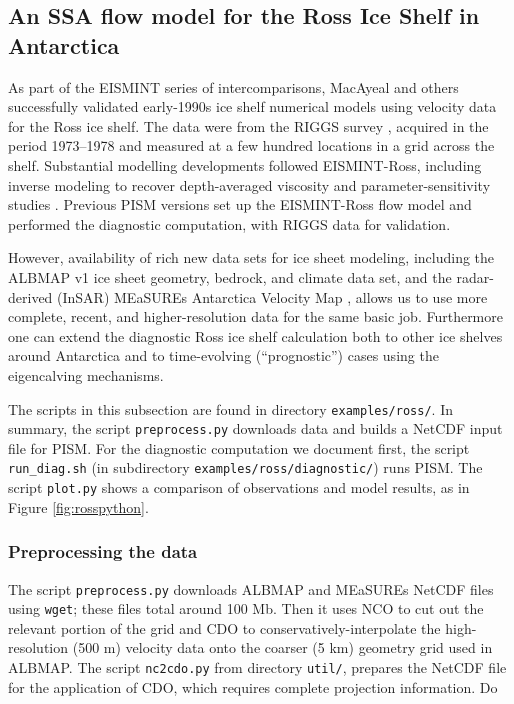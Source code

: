 \subsection{An SSA flow model for the Ross Ice Shelf in Antarctica}\label{sec:ross}   

As part of the EISMINT series of intercomparisons, MacAyeal and others \cite{MacAyealetal} successfully validated early-1990s ice shelf numerical models using velocity data for the Ross ice shelf.  The data were from the RIGGS survey \cite{RIGGS2}, acquired in the period 1973--1978 and measured at a few hundred locations in a grid across the shelf.  Substantial modelling developments followed EISMINT-Ross, including inverse modeling to recover depth-averaged viscosity \cite{RommelaereMacAyeal} and parameter-sensitivity studies \cite{HumbertGreveHutter}.  Previous PISM versions set up the EISMINT-Ross flow model and performed the diagnostic computation, with RIGGS data for validation.

However, availability of rich new data sets for ice sheet modeling, including the ALBMAP v1 \cite{LeBrocqetal2010} ice sheet geometry, bedrock, and climate data set, and the radar-derived (InSAR) MEaSUREs Antarctica Velocity Map \cite{Rignotetal2011}, allows us to use more complete, recent, and higher-resolution data for the same basic job.  Furthermore one can extend the diagnostic Ross ice shelf calculation both to other ice shelves around Antarctica and to time-evolving (``prognostic'') cases using the eigencalving \cite{Levermannetal2012} mechanisms.

The scripts in this subsection are found in directory \texttt{examples/ross/}.  In summary, the script \texttt{preprocess.py} downloads data and builds a NetCDF input file for PISM.  For the diagnostic computation we document first, the script \texttt{run_diag.sh} (in subdirectory \texttt{examples/ross/diagnostic/}) runs PISM.  The script \texttt{plot.py} shows a comparison of observations and model results, as in Figure \ref{fig:rosspython}.

\subsubsection*{Preprocessing the data}  The script \texttt{preprocess.py} downloads ALBMAP and MEaSUREs NetCDF files using \texttt{wget}; these files total around 100 Mb.  Then it uses NCO to cut out the relevant portion of the grid and CDO to conservatively-interpolate the high-resolution (500 m) velocity data onto the coarser (5 km) geometry grid used in ALBMAP.  The script \texttt{nc2cdo.py} from directory \texttt{util/}, prepares the NetCDF file for the application of CDO, which requires complete projection information.  Do

